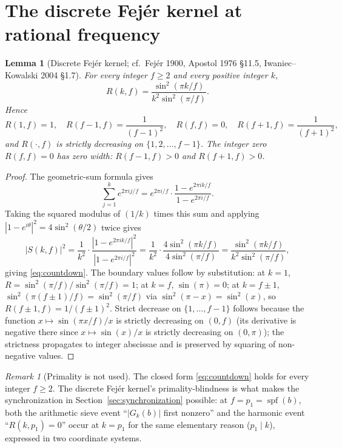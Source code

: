 \documentclass[11pt,reqno]{amsart}
\theoremstyle{plain}
\newtheorem{lemma}[theorem]{Lemma}
\theoremstyle{definition}
\theoremstyle{remark}
\newtheorem{remark}[theorem]{Remark}
\DeclareMathOperator{\spf}{spf}
\begin{document}
\section{The discrete Fej\'er kernel at rational frequency}
\label{sec:lemma}

\begin{lemma}[Discrete Fej\'er kernel; cf.\ Fej\'er 1900,
Apostol 1976 \S11.5, Iwaniec--Kowalski 2004 \S1.7]
\label{lem:countdown}
For every integer $f \ge 2$ and every positive integer $k$,
\begin{equation}
  R(k, f) = \frac{\sin^2(\pi k / f)}{k^2 \sin^2(\pi / f)}.
  \label{eq:countdown}
\end{equation}
Hence
\[
  R(1, f) = 1,
  \quad
  R(f-1, f) = \frac{1}{(f-1)^2},
  \quad
  R(f, f) = 0,
  \quad
  R(f+1, f) = \frac{1}{(f+1)^2},
\]
and $R(\cdot, f)$ is strictly decreasing on $\{1, 2, \ldots, f-1\}$.
The integer zero $R(f, f) = 0$ has zero width: $R(f-1, f) > 0$
and $R(f+1, f) > 0$.
\end{lemma}

\begin{proof}
The geometric-sum formula gives
\[
  \sum_{j=1}^{k} e^{2\pi i j / f}
  = e^{2\pi i / f} \cdot \frac{1 - e^{2\pi i k / f}}{1 - e^{2\pi i / f}}.
\]
Taking the squared modulus of $(1/k)$ times this sum and applying
$|1 - e^{i\theta}|^2 = 4 \sin^2(\theta/2)$ twice gives
\[
  |S(k, f)|^2
  = \frac{1}{k^2} \cdot \frac{|1 - e^{2\pi i k / f}|^2}{|1 - e^{2\pi i / f}|^2}
  = \frac{1}{k^2} \cdot \frac{4 \sin^2(\pi k / f)}{4 \sin^2(\pi / f)}
  = \frac{\sin^2(\pi k / f)}{k^2 \sin^2(\pi / f)},
\]
giving \eqref{eq:countdown}. The boundary values follow by
substitution: at $k = 1$, $R = \sin^2(\pi/f)/\sin^2(\pi/f) = 1$;
at $k = f$, $\sin(\pi) = 0$; at $k = f \pm 1$,
$\sin^2(\pi(f \pm 1)/f) = \sin^2(\pi/f)$ via
$\sin^2(\pi - x) = \sin^2(x)$, so
$R(f \pm 1, f) = 1/(f \pm 1)^2$. Strict decrease on
$\{1, \ldots, f-1\}$ follows because the function
$x \mapsto \sin(\pi x / f) / x$ is strictly decreasing on
$(0, f)$ (its derivative is negative there since
$x \mapsto \sin(x)/x$ is strictly decreasing on $(0, \pi)$); the
strictness propagates to integer abscissae and is preserved by
squaring of non-negative values.
\end{proof}

\begin{remark}[Primality is not used]
The closed form \eqref{eq:countdown} holds for every integer
$f \ge 2$. The discrete Fej\'er kernel's primality-blindness is
what makes the synchronization in
Section~\ref{sec:synchronization} possible: at $f = p_1 =
\spf(b)$, both the arithmetic sieve event ``$|G_k(b)|$ first
nonzero'' and the harmonic event ``$R(k, p_1) = 0$'' occur at
$k = p_1$ for the same elementary reason ($p_1 \mid k$),
expressed in two coordinate systems.
\end{remark}
\end{document}
